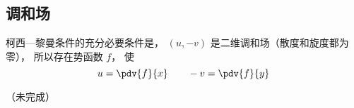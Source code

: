
\subsection{调和场}

柯西—黎曼条件的充分必要条件是， $(u, -v)$ 是二维调和场（散度和旋度都为零）， 所以存在势函数 $f$， 使
\begin{equation}
u = \pdv{f}{x} \qquad -v = \pdv{f}{y}
\end{equation}

（未完成）
